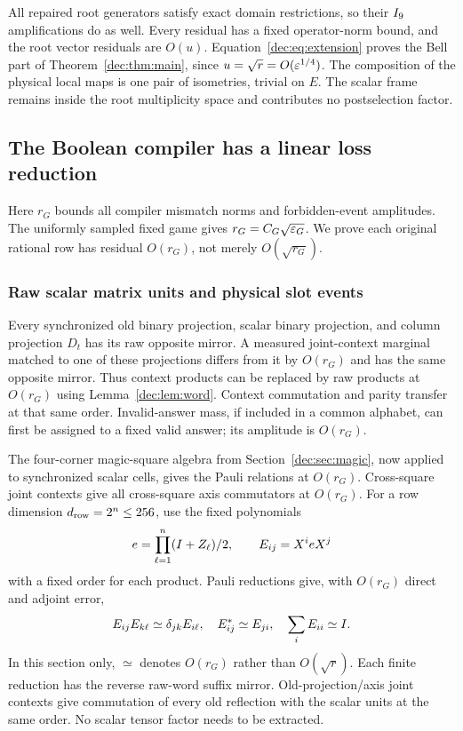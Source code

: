 All repaired root generators satisfy exact domain restrictions, so their $I_9$ amplifications do as well. Every residual has a fixed operator-norm bound, and the root vector residuals are $O(u)$. Equation~\eqref{dec:eq:extension} proves the Bell part of Theorem~\ref{dec:thm:main}, since $u=\sqrt r=O(\varepsilon^{1/4})$. The composition of the physical local maps is one pair of isometries, trivial on $E$. The scalar frame remains inside the root multiplicity space and contributes no postselection factor.

\subsection{The Boolean compiler has a linear loss reduction}\label{dec:sec:compiler}
Here $r_G$ bounds all compiler mismatch norms and forbidden-event amplitudes. The uniformly sampled fixed game gives $r_G=C_G\sqrt{\varepsilon_G}$. We prove each original rational row has residual $O(r_G)$, not merely $O(\sqrt{r_G})$.

\subsubsection{Raw scalar matrix units and physical slot events}
Every synchronized old binary projection, scalar binary projection, and column projection $D_t$ has its raw opposite mirror. A measured joint-context marginal matched to one of these projections differs from it by $O(r_G)$ and has the same opposite mirror. Thus context products can be replaced by raw products at $O(r_G)$ using Lemma~\ref{dec:lem:word}. Context commutation and parity transfer at that same order. Invalid-answer mass, if included in a common alphabet, can first be assigned to a fixed valid answer; its amplitude is $O(r_G)$.

The four-corner magic-square algebra from Section~\ref{dec:sec:magic}, now applied to synchronized scalar cells, gives the Pauli relations at $O(r_G)$. Cross-square joint contexts give all cross-square axis commutators at $O(r_G)$. For a row dimension $d_{\rm row}=2^n\le256$, use the fixed polynomials
\[
e=\prod_{\ell=1}^n(I+Z_\ell)/2,\qquad
E_{ij}=X^ieX^j
\]
with a fixed order for each product. Pauli reductions give, with $O(r_G)$ direct and adjoint error,
\[
E_{ij}E_{k\ell}\simeq\delta_{jk}E_{i\ell},\quad
E_{ij}^*\simeq E_{ji},\quad \sum_iE_{ii}\simeq I.
\]
In this section only, $\simeq$ denotes $O(r_G)$ rather than $O(\sqrt r)$. Each finite reduction has the reverse raw-word suffix mirror. Old-projection/axis joint contexts give commutation of every old reflection with the scalar units at the same order. No scalar tensor factor needs to be extracted.

